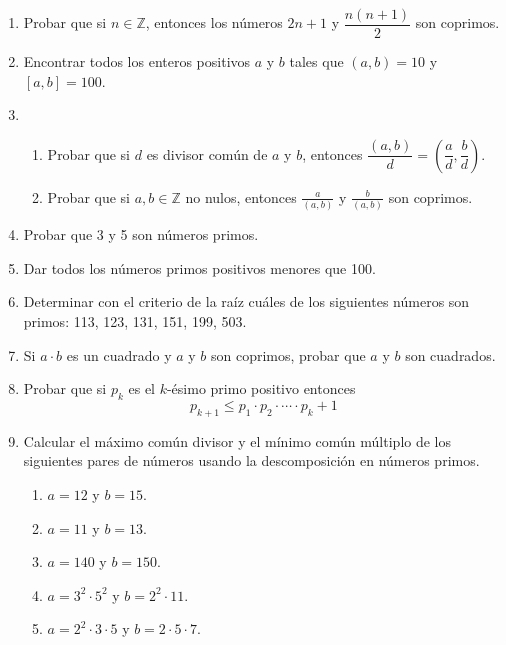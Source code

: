\documentclass[12pt,spanish,makeidx]{amsbook}
\begin{document}
\begin{enumerate}
\begin{enumerate}
\end{enumerate}



\smallskip

\item Probar que si $n \in {\mathbb Z}$, entonces los números $2n+1$ y $\dfrac{n(n+1)}{2}$ son coprimos.

\smallskip



\item Encontrar todos los enteros positivos $a$ y $b$ tales que $(a,b)=10$ y $[a,b]=100$.


\smallskip
\item
\begin{enumerate}
\item Probar que si $d$ es divisor común de $a$ y $b$, entonces $\dfrac{(a,b)}{d} = \left(\dfrac{a}{d}, \dfrac{b}{d}\right)$.
\item Probar que si $a,b\in \mathbb Z$ no nulos, entonces  $\displaystyle \frac a{(a,b)}$ y $\displaystyle \frac b{(a,b)}$ son coprimos.
\end{enumerate}

\smallskip

\item Probar que 3  y 5 son números primos.

\smallskip

\item  Dar todos los números primos positivos menores que 100.

\smallskip

\item Determinar con el criterio de la raíz  cuáles de los siguientes números son primos: 113, 123, 131, 151, 199, 503.

\smallskip

\item Si $a\cdot b$ es un cuadrado y $a$ y $b$ son coprimos, probar que $a$ y $b$ son cuadrados.

\smallskip
\item Probar que si $p_k$ es el $k$-ésimo primo positivo entonces
$$p_{k+1}\leq p_1\cdot p_2\cdot \cdots \cdot p_k+1$$

\smallskip


\item Calcular el máximo común divisor y el mínimo común múltiplo de los siguientes pares de números usando la descomposición en números primos. 
\begin{multicols}{3}
	\begin{enumerate}
		\item $a=12$ y $b=15$. 
		\item$a=11$ y $b=13$.
		\item $a=140$ y $b=150$.
		\item $a=3^2 \cdot 5^2$ y $b=2^2 \cdot 11$.
		\item $a=2^2 \cdot 3\cdot 5$ y $b=2\cdot 5\cdot 7$.
	\end{enumerate}
\end{multicols}


\end{enumerate}
\end{document}
